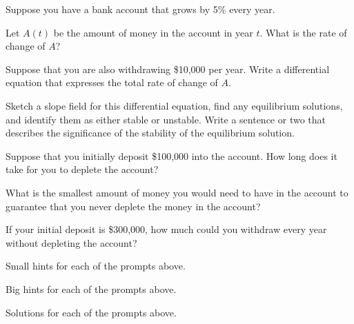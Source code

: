 \begin{activity} \label{A:7.4.1}  
  Suppose you have a bank account that grows by 5\% every year.

\ba
\item Let $A(t)$ be the amount of money in the account in year $t$.
  What is the rate of change of $A$?

\item Suppose that you are also withdrawing \$10,000 per year.  Write
  a differential equation that expresses the total rate of change of
  $A$. 

\item Sketch a slope field for this differential equation, find any
  equilibrium solutions, and identify them as either stable or
  unstable.  Write a sentence or two that describes the significance
  of the stability of the equilibrium solution.

\item Suppose that you initially deposit \$100,000 into the account.  How
  long does it take for you to deplete the account?

\item What is the smallest amount of money you would need to have in
  the account to guarantee that you never deplete the money in the
  account? 
\item If your initial deposit is \$300,000, how much could you
  withdraw every year without depleting the account?

\ea
\end{activity}
\begin{smallhint}
\ba
	\item Small hints for each of the prompts above.
\ea
\end{smallhint}
\begin{bighint}
\ba
	\item Big hints for each of the prompts above.
\ea
\end{bighint}
\begin{activitySolution}
\ba
	\item Solutions for each of the prompts above.
\ea
\end{activitySolution}
\aftera